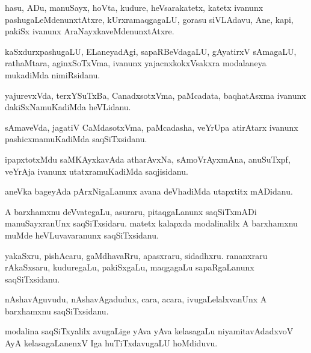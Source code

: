 \documentclass{article}
\begin{document}
\begin{mn}%
hasu, ADu, manuSayx, hoVta, kudure, heVsarakatetx, katetx ivanunx
pashugaLeMdenunxtAtxre, kUrxramaqgagaLU, gorasu siVLAdavu, Ane, kapi,
pakiSx ivanunx AraNayxkaveMdenunxtAtxre.
\end{mn}

\begin{mn}
kaSxdurxpashugaLU, ELaneyadAgi, sapaRBeVdagaLU, gAyatirxV sAmagaLU,
rathaMtara, aginxSoTxVma, ivanunx yajacnxkokxVsakxra modalaneya
mukadiMda nimiRsidanu.
\end{mn}

\begin{mn}
yajurevxVda, terxYSuTxBa, CanadxsotxVma, paMcadata, baqhatAsxma
ivanunx dakiSxNamuKadiMda heVLidanu.
\end{mn}

\begin{mn}
sAmaveVda, jagatiV CaMdasotxVma, paMcadasha, veYrUpa atirAtarx ivanunx
pashicxmamuKadiMda saqSiTxsidanu.
\end{mn}

\begin{mn}%
ipapxtotxMdu saMKAyxkavAda atharAvxNa, sAmoVrAyxmAna, anuSuTxpf,
veYrAja ivanunx utatxramuKadiMda saqjisidanu.
\end{mn}

\begin{mn}
aneVka bageyAda pArxNigaLanunx avana deVhadiMda utapxtitx mADidanu.
\end{mn}

\begin{mn}
A barxhamxnu deVvategaLu, asuraru, pitaqgaLanunx saqSiTxmADi
manuSayxranUnx saqSiTxsidaru. matetx kalapxda modalinalilx A
barxhamxnu muMde heVLuvavaranunx saqSiTxsidanu.
\end{mn}

\begin{mn}
yakaSxru, pishAcaru, gaMdhavaRru, apasxraru, sidadhxru. rananxraru
rAkaSxsaru, kuduregaLu, pakiSxgaLu, maqgagaLu sapaRgaLanunx saqSiTxsidanu.
\end{mn}

\begin{mn}
nAshavAguvudu, nAshavAgadudux, cara, acara, ivugaLelalxvanUnx A
barxhamxnu saqSiTxsidanu.
\end{mn}

\begin{mn}%
modalina saqSiTxyalilx avugaLige yAva yAva kelasagaLu
niyamitavAdadxvoV AyA kelasagaLanenxV Iga huTiTxdavugaLU hoMdiduvu.
\end{mn}
\end{document}
